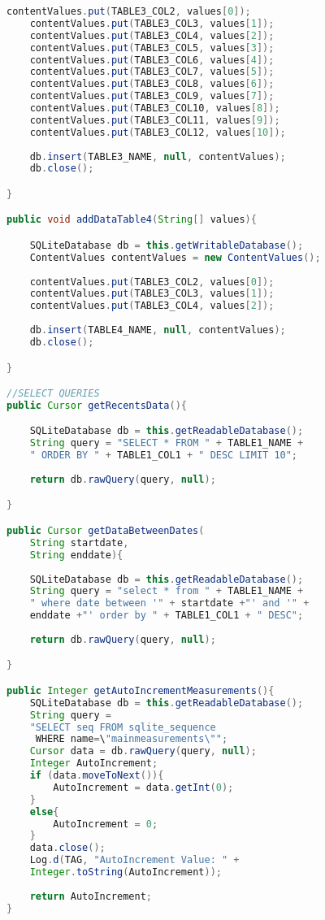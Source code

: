\begin{lstlisting}[language=java, caption={Clase DatabaseHelper, crea la base de datos de no existir y contiene las consultas e inserciones a la misma}, captionpos=b, basicstyle=\small]
	contentValues.put(TABLE3_COL2, values[0]);
	contentValues.put(TABLE3_COL3, values[1]);
	contentValues.put(TABLE3_COL4, values[2]);
	contentValues.put(TABLE3_COL5, values[3]);
	contentValues.put(TABLE3_COL6, values[4]);
	contentValues.put(TABLE3_COL7, values[5]);
	contentValues.put(TABLE3_COL8, values[6]);
	contentValues.put(TABLE3_COL9, values[7]);
	contentValues.put(TABLE3_COL10, values[8]);
	contentValues.put(TABLE3_COL11, values[9]);
	contentValues.put(TABLE3_COL12, values[10]);
	
	db.insert(TABLE3_NAME, null, contentValues);
	db.close();

}

public void addDataTable4(String[] values){

	SQLiteDatabase db = this.getWritableDatabase();
	ContentValues contentValues = new ContentValues();
	
	contentValues.put(TABLE3_COL2, values[0]);
	contentValues.put(TABLE3_COL3, values[1]);
	contentValues.put(TABLE3_COL4, values[2]);
	
	db.insert(TABLE4_NAME, null, contentValues);
	db.close();

}

//SELECT QUERIES
public Cursor getRecentsData(){

	SQLiteDatabase db = this.getReadableDatabase();
	String query = "SELECT * FROM " + TABLE1_NAME + 
	" ORDER BY " + TABLE1_COL1 + " DESC LIMIT 10";
	
	return db.rawQuery(query, null);

}

public Cursor getDataBetweenDates(
	String startdate, 
	String enddate){
	
	SQLiteDatabase db = this.getReadableDatabase();
	String query = "select * from " + TABLE1_NAME + 
	" where date between '" + startdate +"' and '" + 
	enddate +"' order by " + TABLE1_COL1 + " DESC";
	
	return db.rawQuery(query, null);

}

public Integer getAutoIncrementMeasurements(){
	SQLiteDatabase db = this.getReadableDatabase();
	String query = 
	"SELECT seq FROM sqlite_sequence
	 WHERE name=\"mainmeasurements\"";
	Cursor data = db.rawQuery(query, null);
	Integer AutoIncrement;
	if (data.moveToNext()){
		AutoIncrement = data.getInt(0);
	}
	else{
		AutoIncrement = 0;
	}
	data.close();
	Log.d(TAG, "AutoIncrement Value: " + 
	Integer.toString(AutoIncrement));
	
	return AutoIncrement;
}


\end{lstlisting}
